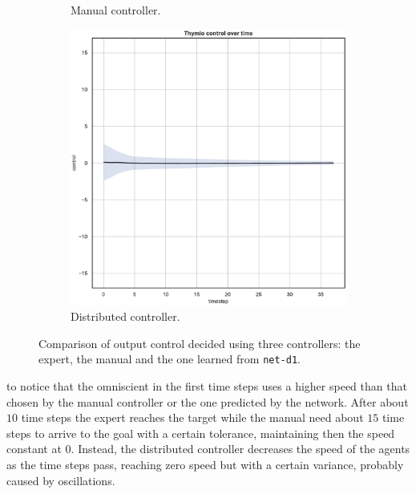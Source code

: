 \begin{figure}[!htb]
\begin{subfigure}[h]{0.3\textwidth}
		\caption{Manual controller.}
	\end{subfigure}
	\hfill
	\begin{subfigure}[h]{0.3\textwidth}
		\centering
		\includegraphics[width=\textwidth]{contents/images/net-d1/control-overtime-learned_distributed}
		\caption{Distributed controller.}
	\end{subfigure}
	\caption[Evaluation of the control learned by \texttt{net-d1}.]{Comparison 
		of output control decided using three controllers: the expert, the manual 
		and the one learned from \texttt{net-d1}.}
	\label{fig:net-d1control}
\end{figure}

\noindent
to notice that the omniscient in the first time steps uses a higher speed than that 
chosen by the manual controller or the one predicted by the network. 
After about $10$ time steps the expert reaches the target while the manual need 
about $15$ time steps to arrive to the goal with a certain tolerance, maintaining 
then the speed constant at $0$. Instead, the distributed controller decreases the 
speed of the agents as the time steps pass, reaching zero speed but with a certain 
variance, probably caused by oscillations.

